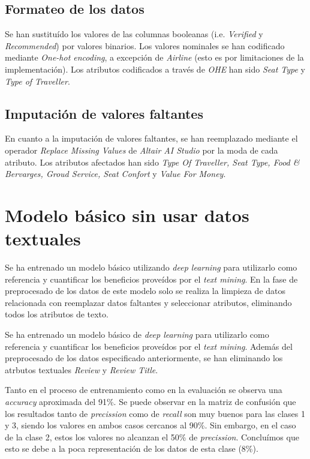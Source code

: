 \documentclass[es]{uc3mreport}
\begin{document}
\begin{report}
\subsection{Formateo de los datos}
\label{sec:formateo}
Se han sustituído los valores de las columnas booleanas (i.e. \textit{Verified} y \textit{Recommended}) por valores binarios. Los valores nominales se han codificado mediante \textit{One-hot encoding}, a excepción de \textit{Airline} (esto es por limitaciones de la implementación). Los atributos codificados a través de \textit{OHE} han sido \textit{Seat Type} y \textit{Type of Traveller}.

\subsection{Imputación de valores faltantes}
\label{sec:imputacion}
En cuanto a la imputación de valores faltantes, se han reemplazado mediante el operador \textit{Replace Missing Values} de \textit{Altair AI Studio} por la moda de cada atributo. Los atributos afectados han sido \textit{Type Of Traveller, Seat Type, Food \& Bervarges, Groud Service, Seat Confort} y \textit{Value For Money}.

\section{Modelo básico sin usar datos textuales}
\label{chap:basicModel}
Se ha entrenado un modelo básico utilizando \textit{deep learning} para utilizarlo como referencia y cuantificar los beneficios proveídos por el \textit{text mining}. En la fase de preprocesado de los datos de este modelo solo se realiza la limpieza de datos relacionada con reemplazar datos faltantes y seleccionar atributos, eliminando todos los atributos de texto.

Se ha entrenado un modelo básico de \textit{deep learning} para utilizarlo como referencia y cuantificar los beneficios proveídos %
por el \textit{text mining}. Además del preprocesado de los datos especificado anteriormente, se han eliminando los atrbutos textuales \textit{Review} y \textit{Review Title}.

Tanto en el proceso de entrenamiento como en la evaluación se observa una \textit{accuracy} aproximada del 91\%. Se puede observar en la matriz de confusión que los resultados tanto de \textit{precission} como de \textit{recall} son muy buenos para las clases 1 y 3, siendo los valores en ambos casos cercanos al 90\%. Sin embargo, en el caso de la clase 2, estos los valores no alcanzan el 50\% de \textit{precission}. Concluímos que esto se debe a la poca representación de los datos de esta clase (8\%).


\end{report}
\end{document}
